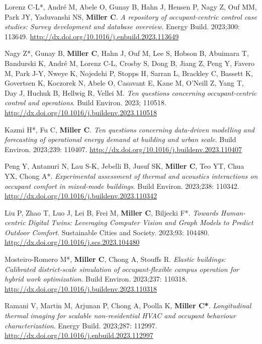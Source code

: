 \documentclass[10pt,a4paper]{article}
\begin{document}
\begin{small}
\begin{etaremune}
\item
Lorenz C-L*, André M, Abele O, Gunay B, Hahn J, Hensen P, Nagy Z, Ouf MM, Park JY, Yaduvanshi NS, \textbf{Miller C}. \emph{A repository of occupant-centric control case studies: Survey development and database overview}. Energy Build. 2023;300: 113649. \url{http://dx.doi.org/10.1016/j.enbuild.2023.113649}
\item
Nagy Z*, Gunay B, \textbf{Miller C}, Hahn J, Ouf M, Lee S, Hobson B, Abuimara T, Bandurski K, André M, Lorenz C-L, Crosby S, Dong B, Jiang Z, Peng Y, Favero M, Park J-Y, Nweye K, Nojedehi P, Stopps H, Sarran L, Brackley C, Bassett K, Govertsen K, Koczorek N, Abele O, Casavant E, Kane M, O'Neill Z, Yang T, Day J, Huchuk B, Hellwig R, Vellei M. \emph{Ten questions concerning occupant-centric control and operations}. Build Environ. 2023; 110518. \url{http://dx.doi.org/10.1016/j.buildenv.2023.110518}
\item
Kazmi H*, Fu C, \textbf{Miller C}. \emph{Ten questions concerning data-driven modelling and forecasting of operational energy demand at building and urban scale}. Build Environ. 2023;239: 110407. \url{http://dx.doi.org/10.1016/j.buildenv.2023.110407}
\item
Peng Y, Antanuri N, Lau S-K, Jebelli B, Jusuf SK, \textbf{Miller C}, Teo YT, Chua YX, Chong A*. \emph{Experimental assessment of thermal and acoustics interactions on occupant comfort in mixed-mode buildings}. Build Environ. 2023;238: 110342. \url{http://dx.doi.org/10.1016/j.buildenv.2023.110342}
\item
Liu P, Zhao T, Luo J, Lei B, Frei M, \textbf{Miller C}, Biljecki F*. \emph{Towards Human-centric Digital Twins: Leveraging Computer Vision and Graph Models to Predict Outdoor Comfort}. Sustainable Cities and Society. 2023;93: 104480. \url{http://dx.doi.org/10.1016/j.scs.2023.104480}
\item
Mosteiro-Romero M*, \textbf{Miller C}, Chong A, Stouffs R. \emph{Elastic buildings: Calibrated district-scale simulation of occupant-flexible campus operation for hybrid work optimization}. Build Environ. 2023;237: 110318. \url{http://dx.doi.org/10.1016/j.buildenv.2023.110318}
\item
Ramani V, Martin M, Arjunan P, Chong A, Poolla K, \textbf{Miller C*}. \emph{Longitudinal thermal imaging for scalable non-residential HVAC and occupant behaviour characterization}. Energy Build. 2023;287: 112997. \url{http://dx.doi.org/10.1016/j.enbuild.2023.112997}
\item

\end{etaremune}
\end{small}
\end{document}
